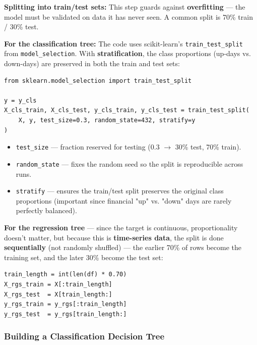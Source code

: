 \documentclass[12pt,openany]{book}
\begin{document}
\textbf{Splitting into train/test sets:} This step guards against \textbf{overfitting} --- the model must be validated on data it has never seen. A common split is 70\% train / 30\% test.

\textbf{For the classification tree:} The code uses scikit-learn's \texttt{train\_test\_split} from \texttt{model\_selection}. With \textbf{stratification}, the class proportions (up-days vs. down-days) are preserved in both the train and test sets:

\begin{Verbatim}[breaklines=true,fontsize=\small]
from sklearn.model_selection import train_test_split

y = y_cls
X_cls_train, X_cls_test, y_cls_train, y_cls_test = train_test_split(
    X, y, test_size=0.3, random_state=432, stratify=y
)
\end{Verbatim}


\begin{itemize}[leftmargin=*]
    \item \texttt{test\_size} --- fraction reserved for testing (0.3 \(\rightarrow\) 30\% test, 70\% train).
    \item \texttt{random\_state} --- fixes the random seed so the split is reproducible across runs.
    \item \texttt{stratify} --- ensures the train/test split preserves the original class proportions (important since financial "up" vs. "down" days are rarely perfectly balanced).

\end{itemize}

\textbf{For the regression tree} --- since the target is continuous, proportionality doesn't matter, but because this is \textbf{time-series data}, the split is done \textbf{sequentially} (not randomly shuffled) --- the earlier 70\% of rows become the training set, and the later 30\% become the test set:

\begin{Verbatim}[breaklines=true,fontsize=\small]
train_length = int(len(df) * 0.70)
X_rgs_train = X[:train_length]
X_rgs_test  = X[train_length:]
y_rgs_train = y_rgs[:train_length]
y_rgs_test  = y_rgs[train_length:]
\end{Verbatim}


\subsubsection{Building a Classification Decision Tree}
\end{document}
